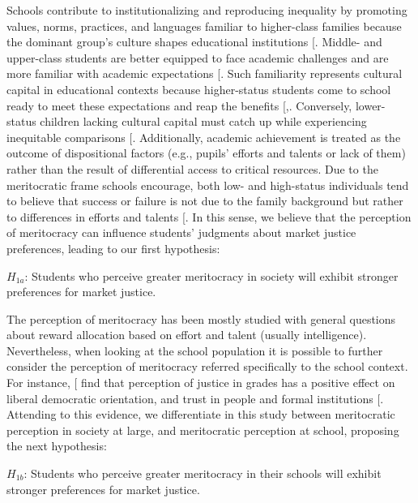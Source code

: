 \documentclass[
  12pt,
  letterpaper,
]{article}
\begin{document}
Schools contribute to institutionalizing and reproducing inequality by
promoting values, norms, practices, and languages familiar to
higher-class families because the dominant group's culture shapes
educational institutions
{[}\citeproc{ref-bourdieu_reproduction_1990}{1}{]}. Middle- and
upper-class students are better equipped to face academic challenges and
are more familiar with academic expectations
{[}\citeproc{ref-mikus_children_2019}{59}{]}. Such familiarity
represents cultural capital in educational contexts because
higher-status students come to school ready to meet these expectations
and reap the benefits
{[},\citeproc{ref-khan_privilege_2011}{61}{]}.
Conversely, lower-status children lacking cultural capital must catch up
while experiencing inequitable comparisons
{[}\citeproc{ref-goudeau_hidden_2017}{62}{]}. Additionally, academic
achievement is treated as the outcome of dispositional factors (e.g.,
pupils' efforts and talents or lack of them) rather than the result of
differential access to critical resources. Due to the meritocratic frame
schools encourage, both low- and high-status individuals tend to believe
that success or failure is not due to the family background but rather
to differences in efforts and talents
{[}\citeproc{ref-darnon_where_2018}{63}{]}. In this sense, we believe
that the perception of meritocracy can influence students' judgments
about market justice preferences, leading to our first hypothesis:

\(H_{1a}\): Students who perceive greater meritocracy in society will
exhibit stronger preferences for market justice.

The perception of meritocracy has been mostly studied with general
questions about reward allocation based on effort and talent (usually
intelligence). Nevertheless, when looking at the school population it is
possible to further consider the perception of meritocracy referred
specifically to the school context. For instance,
{[}\citeproc{ref-resh_sense_2010}{64}{]} find that perception of justice
in grades has a positive effect on liberal democratic orientation, and
trust in people and formal institutions
{[}\citeproc{ref-resh_sense_2014}{65}{]}. Attending to this evidence, we
differentiate in this study between meritocratic perception in society
at large, and meritocratic perception at school, proposing the next
hypothesis:

\(H_{1b}\): Students who perceive greater meritocracy in their schools
will exhibit stronger preferences for market justice.
\end{document}
